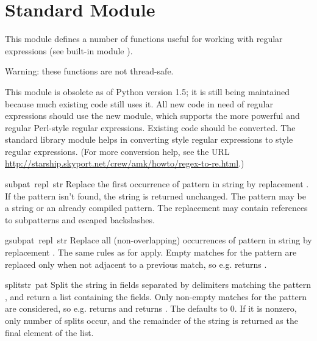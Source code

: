 \section{Standard Module }
\label{module-regsub}

This module defines a number of functions useful for working with
regular expressions (see built-in module ).

Warning: these functions are not thread-safe.

This module is obsolete as of Python version 1.5; it is still being
maintained because much existing code still uses it.  All new code in
need of regular expressions should use the new  module, which
supports the more powerful and regular Perl-style regular expressions.
Existing code should be converted.  The standard library module
 helps in converting  style regular
expressions to  style regular expressions.  (For more
conversion help, see the URL
\url{http://starship.skyport.net/crew/amk/howto/regex-to-re.html}.)


\begin{funcdesc}{sub}{pat\, repl\, str}
Replace the first occurrence of pattern  in string
 by replacement .  If the pattern isn't found,
the string is returned unchanged.  The pattern may be a string or an
already compiled pattern.  The replacement may contain references
 to subpatterns and escaped backslashes.
\end{funcdesc}

\begin{funcdesc}{gsub}{pat\, repl\, str}
Replace all (non-overlapping) occurrences of pattern  in
string  by replacement .  The same rules as for
 apply.  Empty matches for the pattern are replaced only
when not adjacent to a previous match, so e.g.
 returns .
\end{funcdesc}

\begin{funcdesc}{split}{str\, pat}
Split the string  in fields separated by delimiters matching
the pattern , and return a list containing the fields.  Only
non-empty matches for the pattern are considered, so e.g.
 returns \code{['a', 'b']} and
 returns \code{['abc']}.  The 
defaults to 0. If it is nonzero, only  number of splits
occur, and the remainder of the string is returned as the final
element of the list.
\end{funcdesc}


